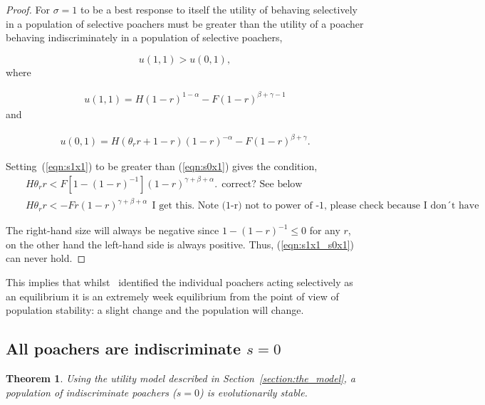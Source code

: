 \documentclass[10pt]{article}
\newtheorem{theorem}{Theorem}
\begin{document}
\begin{proof}
    For \(\sigma=1\) to be a best response to itself the utility of behaving 
    selectively in a population of selective poachers must be greater than the utility
    of a poacher behaving indiscriminately in a population of selective poachers,

    \begin{equation}
    u(1,1) > u(0,1),
    \end{equation}    
    where
    
    \begin{eqnarray}
    \label{eqn:s1x1}
    u(1,1) = H(1 - r)^{1 - \alpha} - F(1 - r)^{\beta + \gamma - 1}
    \end{eqnarray}    
    and 
    
    \begin{eqnarray}
    \label{eqn:s0x1}
    u(0,1) = H(\theta_r r +1 - r)(1 - r)^{-\alpha} - F(1 - r)^{\beta + \gamma} .
    \end{eqnarray}

    Setting~(\ref{eqn:s1x1}) to be greater than (\ref{eqn:s0x1}) gives the 
    condition,
    \begin{eqnarray}
    \label{eqn:s1x1_s0x1}
    &&H \theta_r r < F [1 - (1 - r)^{-1}](1 - r)^{\gamma + \beta + \alpha}.\:\:\mbox{correct? See below}
    \\
    &&H \theta_r r < -Fr(1 - r)^{\gamma + \beta + \alpha} \:\: \mbox{I get this. Note (1-r) not to power of -1, please check because I don´t have a computer!}
    \end{eqnarray}

    The right-hand size  will always be negative since \(1-(1-r)^{-1} \leq 0\)
    for any \(r\), on the other hand the left-hand side is always positive.
    Thus, (\ref{eqn:s1x1_s0x1}) can never hold. 
\end{proof}

This implies that whilst~\cite{Lee} identified the individual poachers 
acting selectively as an equilibrium it is an extremely week equilibrium from 
the point of view of population stability: a slight change and the population 
will change.

\subsection{All poachers are indiscriminate \(s=0\)}

\begin{theorem}
Using the utility model described in Section~\ref{section:the_model}, a population 
of indiscriminate poachers (\(s=0\)) is evolutionarily stable.
\end{theorem}
\end{document}
